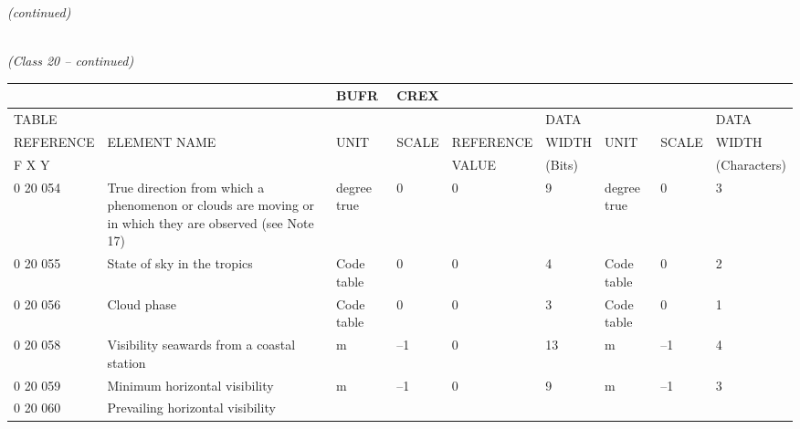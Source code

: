 \emph{(continued)}

\emph{\\
(Class 20 -- continued)}

\begin{longtable}[]{@{}lllllllll@{}}
\toprule
& & BUFR & CREX & & & & &\tabularnewline
\midrule
\endhead
TABLE & & & & & DATA & & & DATA\tabularnewline
REFERENCE & ELEMENT NAME & UNIT & SCALE & REFERENCE & WIDTH & UNIT & SCALE & WIDTH\tabularnewline
F X Y & & & & VALUE & (Bits) & & & (Characters)\tabularnewline
0 20 054 & True direction from which a phenomenon or clouds are moving or in which they are observed (see Note 17) & degree true & 0 & 0 & 9 & degree true & 0 & 3\tabularnewline
0 20 055 & State of sky in the tropics & Code table & 0 & 0 & 4 & Code table & 0 & 2\tabularnewline
0 20 056 & Cloud phase & Code table & 0 & 0 & 3 & Code table & 0 & 1\tabularnewline
0 20 058 & Visibility seawards from a coastal station & m & --1 & 0 & 13 & m & --1 & 4\tabularnewline
0 20 059 & Minimum horizontal visibility & m & --1 & 0 & 9 & m & --1 & 3\tabularnewline
\begin{minipage}[t]{0.08\columnwidth}\raggedright
0 20 060\strut
\end{minipage} & \begin{minipage}[t]{0.08\columnwidth}\raggedright
Prevailing horizontal visibility


\end{minipage}
\end{longtable}
